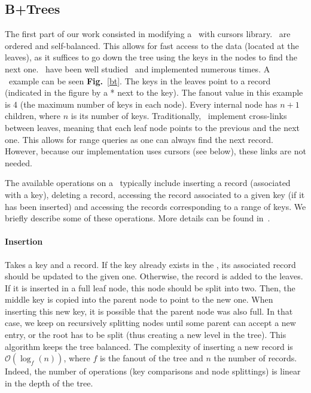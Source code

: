\subsection{B+Trees}
The first part of our work consisted in modifying a \btrees\ with cursors library.
\btrees\ are ordered and self-balanced.
This allows for fast access to the data (located at the leaves), as it suffices to go down the tree using the keys in the nodes to find the next one.
\btrees\ have been well studied~\cite{dbms} and implemented numerous times.
A \btree\ example can be seen \textbf{Fig.}~\ref{bt}.
The keys in the leaves point to a record (indicated in the figure by a * next to the key).
The fanout value in this example is 4 (the maximum number of keys in each node).
Every internal node has $n+1$ children, where $n$ is its number of keys.
Traditionally, \btrees\ implement cross-links between leaves, meaning that each leaf node points to the previous and the next one.
This allows for range queries as one can always find the next record.
However, because our implementation uses cursors (see below), these links are not needed.

The available operations on a \btree\ typically include inserting a record (associated with a key), deleting a record, accessing the record associated to a given key (if it has been inserted) and accessing the records corresponding to a range of keys.
We briefly describe some of these operations. More details can be found in~\cite{dbms}.
\paragraph{Insertion} Takes a key and a record.
If the key already exists in the \btree, its associated record should be updated to the given one. Otherwise, the record is added to the leaves.
If it is inserted in a full leaf node, this node should be split into two. Then, the middle key is copied into the parent node to point to the new one.
When inserting this new key, it is possible that the parent node was also full.
In that case, we keep on recursively splitting nodes until some parent can accept a new entry, or the root has to be split (thus creating a new level in the tree).
This algorithm keeps the tree balanced.
The complexity of inserting a new record is $\mathcal{O}(\log_{f}(n))$, where $f$ is the fanout of the tree and $n$ the number of records.
Indeed, the number of operations (key comparisons and node splittings) is linear in the depth of the tree.

